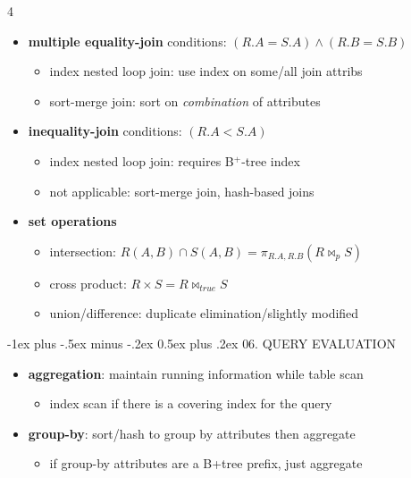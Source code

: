 \documentclass{article}
\makeatletter
\renewcommand{\section}{\@startsection{section}{1}{0mm}%
    {-1ex plus -.5ex minus -.2ex}%
    {0.5ex plus .2ex}%
{\normalfont\small\bfseries}}
\makeatother
\begin{document}
\begin{multicols*}{4}
\begin{scriptsize}
  \begin{itemize}
    \item \textbf{multiple equality-join} conditions: $\scriptscriptstyle(R.A = S.A) \land (R.B=S.B)$
      \begin{itemize}
        \item index nested loop join: use index on some/all join attribs
        \item sort-merge join: sort on \textit{combination} of attributes
      \end{itemize}
    \item \textbf{inequality-join} conditions: $(R.A<S.A)$
      \begin{itemize}
        \item index nested loop join: requires B$^+$-tree index
        \item not applicable: sort-merge join, hash-based joins
      \end{itemize}
    \item \textbf{set operations}
      \begin{itemize}
        \item intersection: $\scriptscriptstyle R(A, B) \cap S(A, B) = \pi_{R.A, R.B} (R \bowtie_p S)$
        \item cross product: $R \times S = R \bowtie_{true} S$
        \item union/difference: duplicate elimination/slightly modified
      \end{itemize}
  \end{itemize}

  \section{06. QUERY EVALUATION}

  \begin{itemize}
    \item \textbf{aggregation}: maintain running information while table scan
      \begin{itemize}
        \item index scan if there is a covering index for the query
      \end{itemize}
    \item \textbf{group-by}: sort/hash to group by attributes then aggregate
      \begin{itemize}
        \item if group-by attributes are a B+tree prefix, just aggregate
      \end{itemize}
  \end{itemize}


\end{scriptsize}
\end{multicols*}
\end{document}
